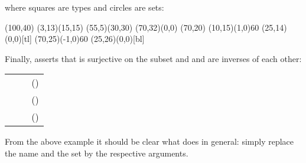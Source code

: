 \begin{isabellebody}
\begin{isamarkuptext}
where squares are types and circles are sets:
\begin{center}
\thicklines
\begin{picture}(100,40)
\put(3,13){\framebox(15,15){}}
\put(55,5){\framebox(30,30){}}
\put(70,32){\makebox(0,0){}}
\put(70,20){}
\put(10,15){\vector(1,0){60}}
\put(25,14){\makebox(0,0)[tl]{}}
\put(70,25){\vector(-1,0){60}}
\put(25,26){\makebox(0,0)[bl]{}}
\end{picture}
\end{center}
Finally,  asserts that  is
surjective on the subset  and  and  are inverses of each other:
\begin{center}
\begin{tabular}{rl}
\isa{Rep{\isacharunderscore}three\ x\ {\isasymin}\ three} &~~ (\isa{Rep{\isacharunderscore}three}) \\
\isa{Abs{\isacharunderscore}three\ {\isacharparenleft}Rep{\isacharunderscore}three\ x{\isacharparenright}\ {\isacharequal}\ x} &~~ (\isa{Rep{\isacharunderscore}three{\isacharunderscore}inverse}) \\
\isa{y\ {\isasymin}\ three\ {\isasymLongrightarrow}\ Rep{\isacharunderscore}three\ {\isacharparenleft}Abs{\isacharunderscore}three\ y{\isacharparenright}\ {\isacharequal}\ y} &~~ (\isa{Abs{\isacharunderscore}three{\isacharunderscore}inverse})
\end{tabular}
\end{center}

From the above example it should be clear what  does
in general: simply replace the name  and the set
 by the respective arguments.


\end{isamarkuptext}
\end{isabellebody}
